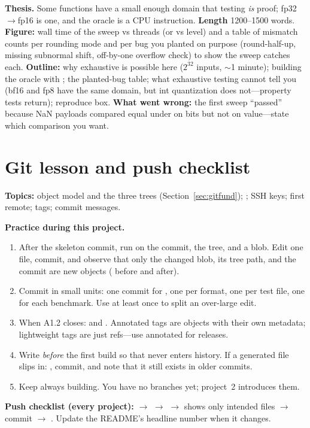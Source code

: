 \begin{blogbox}
\textbf{Thesis.} Some functions have a small enough domain that testing \emph{is} proof; fp32$\to$fp16 is one, and the oracle is a CPU instruction. \textbf{Length} 1200--1500 words. \textbf{Figure:} wall time of the sweep vs threads (or vs  level) and a table of mismatch counts per rounding mode and per bug you planted on purpose (round-half-up, missing subnormal shift, off-by-one overflow check) to show the sweep catches each. \textbf{Outline:} why exhaustive is possible here ($2^{32}$ inputs, $\sim$1 minute); building the oracle with ; the planted-bug table; what exhaustive testing cannot tell you (bf16 and fp8 have the same domain, but int quantization does not---property tests return); reproduce box. \textbf{What went wrong:} the first sweep ``passed'' because NaN payloads compared equal under \code{==} on bits but not on value---state which comparison you want.
\end{blogbox}

\section{Git lesson and push checklist}

\begin{gitbox}
\textbf{Topics:} object model and the three trees (Section~\ref{sec:gitfund}); ; SSH keys; first remote; tags; commit messages.

\textbf{Practice during this project.}
\begin{enumerate}
  \item After the skeleton commit, run  on the commit, the tree, and a blob. Edit one file, commit, and observe that only the changed blob, its tree path, and the commit are new objects ( before and after).
  \item Commit in small units: one commit for , one per format, one per test file, one for each benchmark. Use  at least once to split an over-large edit.
  \item When A1.2 closes:  and . Annotated tags are objects with their own metadata; lightweight tags are just refs---use annotated for releases.
  \item Write  \emph{before} the first build so that  never enters history. If a generated file slips in: , commit, and note that it still exists in older commits.
  \item Keep  always building. You have no branches yet; project~2 introduces them.
\end{enumerate}

\textbf{Push checklist (every project):}  $\to$  $\to$  $\to$  shows only intended files $\to$ commit $\to$ . Update the README's headline number when it changes.
\end{gitbox}
